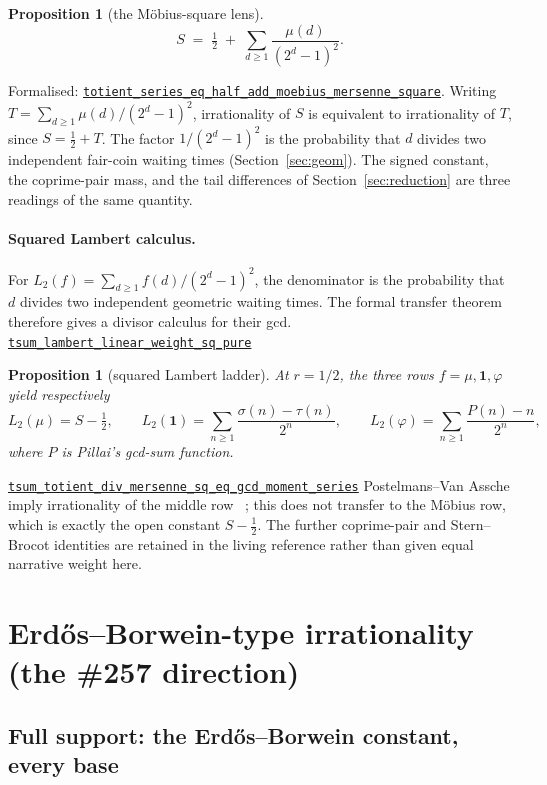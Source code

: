 \documentclass[11pt]{article}
\newcommand{\commit}{81150c1c6fdd4cd51e76d3aa0de344341e0e9e7c}
\newcommand{\repobase}{https://github.com/wcook04/plectis-lean-erdos249-257/blob/\commit}
\newcommand{\PK}{Erdos249257}
\newcommand{\lref}[3]{\href{\repobase/\PK/#1\#L#2}{\nolinkurl{#3}}}
\newcommand{\lrefx}[3]{\href{\repobase/\PK/#1\#L#2}{\nolinkurl{#3}}}
\newtheorem{proposition}[theorem]{Proposition}
\theoremstyle{definition}
\theoremstyle{remark}
\newcommand{\ph}{\varphi}
\begin{document}
\begin{proposition}[the M\"obius-square lens]\label{res:lens}
\[
S \;=\; \tfrac12 \;+\; \sum_{d\ge1}\frac{\mu(d)}{(2^d-1)^2}.
\]
\end{proposition}
\noindent Formalised: \lref{CertificateKernel.lean}{18126}{totient_series_eq_half_add_moebius_mersenne_square}.
Writing $T=\sum_{d\ge1}\mu(d)/(2^d-1)^2$, irrationality of $S$ is equivalent to
irrationality of $T$, since $S=\tfrac12+T$. The factor $1/(2^d-1)^2$ is the
probability that $d$ divides two independent fair-coin waiting times
(Section~\ref{sec:geom}). The signed constant, the coprime-pair mass, and the
tail differences of Section~\ref{sec:reduction} are three readings of the same
quantity.

\paragraph{Squared Lambert calculus.}\label{sec:squared}
For \(L_2(f)=\sum_{d\ge1}f(d)/(2^d-1)^2\), the denominator is the probability
that \(d\) divides two independent geometric waiting times.  The formal
transfer theorem therefore gives a divisor calculus for their gcd.
\lref{GcdMomentCalculus.lean}{105}{tsum_lambert_linear_weight_sq_pure}
\begin{proposition}[squared Lambert ladder]\label{res:gcdmoment}
At \(r=1/2\), the three rows \(f=\mu,\mathbf 1,\ph\) yield respectively
\[
 L_2(\mu)=S-\tfrac12,\qquad
 L_2(\mathbf 1)=\sum_{n\ge1}\frac{\sigma(n)-\tau(n)}{2^n},\qquad
 L_2(\ph)=\sum_{n\ge1}\frac{P(n)-n}{2^n},
\]
where \(P\) is Pillai's gcd-sum function.
\end{proposition}
\lrefx{GcdMomentCalculus.lean}{235}{tsum_totient_div_mersenne_sq_eq_gcd_moment_series}
Postelmans--Van Assche imply irrationality of the middle row
~\cite{postelmansvanassche}; this does not transfer to the M\"obius row, which
is exactly the open constant \(S-\tfrac12\).  The further coprime-pair and
Stern--Brocot identities are retained in the living reference rather than
given equal narrative weight here.

\section{Erd\H{o}s--Borwein-type irrationality (the \#257 direction)}\label{sec:eb}

\subsection{Full support: the Erd\H{o}s--Borwein constant, every base}
\end{document}
